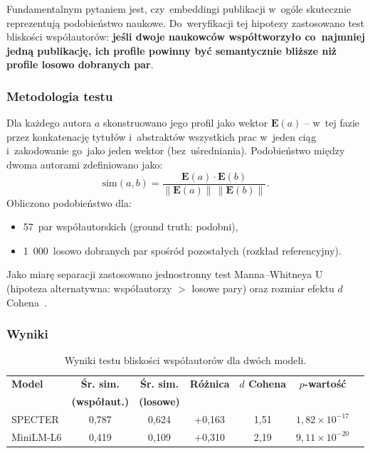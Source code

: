 Fundamentalnym pytaniem jest, czy~embeddingi publikacji
w~ogóle skutecznie reprezentują podobieństwo naukowe.
Do~weryfikacji tej hipotezy zastosowano test bliskości współautorów:
\textbf{jeśli dwoje naukowców współtworzyło co~najmniej jedną publikację,
ich profile powinny być semantycznie bliższe niż profile
losowo dobranych par}.

\subsubsection{Metodologia testu}

Dla każdego autora $a$ skonstruowano jego profil jako wektor
$\mathbf{E}(a)$ -- w~tej fazie przez konkatenację tytułów i~abstraktów
wszystkich prac w~jeden ciąg i~zakodowanie go~jako jeden wektor
(bez~uśredniania).
Podobieństwo między dwoma autorami zdefiniowano jako:
\begin{equation}
    \mathrm{sim}(a,b)
    = \frac{\mathbf{E}(a)\cdot\mathbf{E}(b)}
           {\|\mathbf{E}(a)\|\,\|\mathbf{E}(b)\|}.
\end{equation}
Obliczono podobieństwo dla:
\begin{itemize}
    \item 57~par współautorskich (ground truth: podobni),
    \item 1~000~losowo dobranych par spośród pozostałych
          (rozkład referencyjny).
\end{itemize}
Jako miarę separacji zastosowano jednostronny test Manna--Whitneya U
(hipoteza alternatywna: współautorzy $>$ losowe pary)
oraz rozmiar efektu $d$ Cohena~\cite{cohen1988}.

\subsubsection{Wyniki}

\begin{table}[H]
\centering
\caption{Wyniki testu bliskości współautorów dla dwóch modeli.}
\label{tab:coauthor_test}
\begin{tabular}{lcccccc}
\toprule
\textbf{Model} &
\textbf{Śr. sim.} & \textbf{Śr. sim.} & \textbf{Różnica} &
\textbf{$d$ Cohena} & \textbf{$p$-wartość} \\
& \textbf{(współaut.)} & \textbf{(losowe)} & & & \\
\midrule
SPECTER   & 0{,}787 & 0{,}624 & +0{,}163 & 1{,}51 & $1{,}82 \times 10^{-17}$ \\
MiniLM-L6 & 0{,}419 & 0{,}109 & +0{,}310 & 2{,}19 & $9{,}11 \times 10^{-20}$ \\
\bottomrule
\end{tabular}
\end{table}

